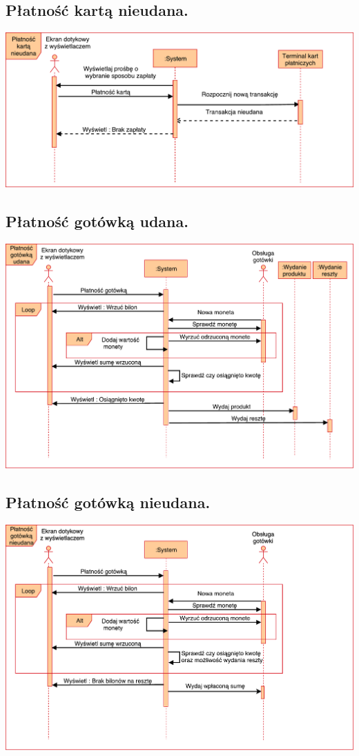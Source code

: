 \documentclass[11pt]{article}
\begin{document}
		\subsection{Płatność kartą nieudana.}
		\begin{center}
			\includegraphics[scale=0.65]{PlatnoscKartaNieudana.pdf}
		\end{center}
		\newpage
		\subsection{Płatność gotówką udana.}
		\begin{center}
			\includegraphics[scale=0.60]{PlatnoscGotowkaUdana.pdf}
		\end{center}
		\subsection{Płatność gotówką nieudana.}
		\begin{center}
			\includegraphics[scale=0.60]{PlatnoscGotowkaNieudana.pdf}
		\end{center}
		\newpage
\end{document}

